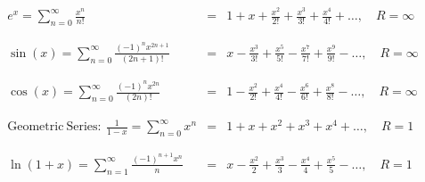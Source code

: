 \begin{eqnarray*}
e^x = \sum_{n=0}^\infty \frac{x^n}{n!} &=& 1+x+\frac{x^2}{2!}+\frac{x^3}{3!}+\frac{x^4}{4!}+\ldots, \quad R=\infty\\
&&\\
&&\\
\sin(x) = \sum_{n=0}^\infty \frac{(-1)^n x^{2n+1}}{(2n+1)!} &=& x-\frac{x^3}{3!}+\frac{x^5}{5!}-\frac{x^7}{7!}+\frac{x^9}{9!}-\ldots, \quad R=\infty\\
&&\\
&&\\
\cos(x) = \sum_{n=0}^\infty \frac{(-1)^n x^{2n}}{(2n)!} &=& 1-\frac{x^2}{2!}+\frac{x^4}{4!}-\frac{x^6}{6!}+\frac{x^8}{8!}-\ldots, \quad R=\infty\\
&&\\
&&\\
\mathrm{Geometric\ Series:\ } \frac{1}{1-x} = \sum_{n=0}^\infty x^{n} &=& 1+x+x^2+x^3+x^4+\ldots, \quad R=1\\
&&\\
&&\\
\ln(1+x) = \sum_{n=1}^\infty \frac{(-1)^{n+1} x^n}{n} &=& x-\frac{x^2}{2}+\frac{x^3}{3}-\frac{x^4}{4}+\frac{x^5}{5}-\ldots, \quad R=1\\
\end{eqnarray*}
%

